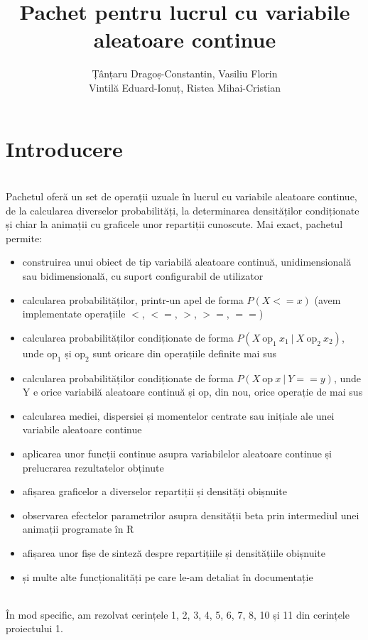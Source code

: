\documentclass[12pt]{article}
\title{Pachet pentru lucrul cu variabile aleatoare continue}
\author{Țânțaru Dragoș-Constantin, Vasiliu Florin \\Vintilă Eduard-Ionuț, Ristea Mihai-Cristian}
\begin{document}
\maketitle
\section{Introducere} \hfill \\
\indent Pachetul oferă un set de operații uzuale în lucrul cu variabile aleatoare continue, de la calcularea diverselor probabilități, la determinarea densităților condiționate și chiar la animații cu graficele unor repartiții cunoscute. Mai exact, pachetul permite:
\begin{itemize}
	\item construirea unui obiect de tip variabilă aleatoare continuă, unidimensională sau bidimensională, cu suport configurabil de utilizator
	\item calcularea probabilităților, printr-un apel de forma $P(X <= x)$ (avem implementate operațiile $<$, $<=$, $>$, $>=$, $==$)
	\item calcularea probabilităților condiționate de forma $P(X \ \mathrm{op_1} \ x_1 \ | \ X \ \mathrm{op_2} \ x_2)$, unde $\mathrm{op_1}$ și $\mathrm{op_2}$ sunt oricare din operațiile definite mai sus
	\item calcularea probabilităților condiționate de forma $P(X \ \mathrm{op} \ x \ | \ Y == y)$, unde Y e orice variabilă aleatoare continuă și op, din nou, orice operație de mai sus
	\item calcularea mediei, dispersiei și momentelor centrate sau inițiale ale unei variabile aleatoare continue
	\item aplicarea unor funcții continue asupra variabilelor aleatoare continue și prelucrarea rezultatelor obținute
	\item afișarea graficelor a diverselor repartiții și densități obișnuite
	\item observarea efectelor parametrilor asupra densității beta prin intermediul unei animații programate în R
	\item afișarea unor fișe de sinteză despre repartițiile și densitățiile obișnuite
	\item și multe alte funcționalități pe care le-am detaliat în documentație
\end{itemize} \hfill \\
\indent În mod specific, am rezolvat cerințele 1, 2, 3, 4, 5, 6, 7, 8, 10 și 11 din cerințele proiectului 1. \\
\end{document}
